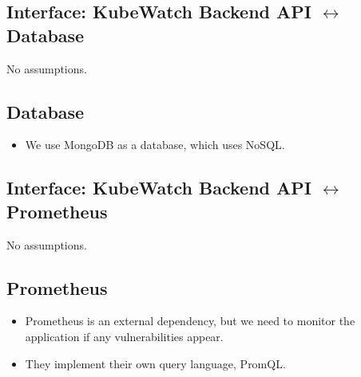 \subsection{Interface: KubeWatch Backend API \(\leftrightarrow\) Database}
No assumptions.

\subsection{Database}
\begin{itemize}
    \item We use MongoDB as a database, which uses NoSQL.
\end{itemize}


\subsection{Interface: KubeWatch Backend API \(\leftrightarrow\) Prometheus}
No assumptions.

\subsection{Prometheus}
\begin{itemize}
    \item Prometheus is an external dependency, but we need to monitor the application if any vulnerabilities appear.
    \item They implement their own query language, PromQL.
\end{itemize}